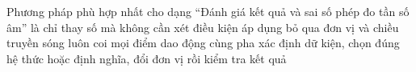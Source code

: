 \begin{ex}
Phương pháp phù hợp nhất cho dạng “Đánh giá kết quả và sai số phép đo tần số âm” là
\choice
{chỉ thay số mà không cần xét điều kiện áp dụng}
{bỏ qua đơn vị và chiều truyền sóng}
{luôn coi mọi điểm dao động cùng pha}
{\True xác định dữ kiện, chọn đúng hệ thức hoặc định nghĩa, đổi đơn vị rồi kiểm tra kết quả}
\end{ex}
